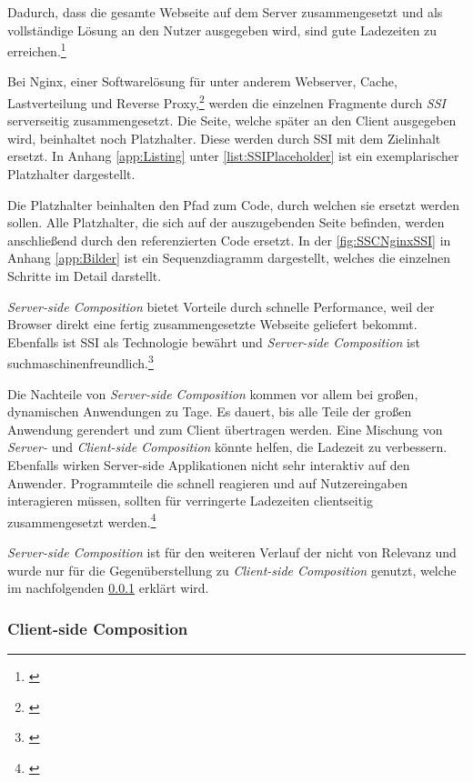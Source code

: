 Dadurch, dass die gesamte Webseite auf dem Server zusammengesetzt und als vollständige Lösung an den Nutzer ausgegeben wird, sind gute Ladezeiten zu erreichen.\footnote{\cite[vgl.][60]{Geers2020}}

Bei Nginx, einer Softwarelösung für unter anderem Webserver, Cache, Lastverteilung und Reverse Proxy,\footnote{\cite[vgl.][]{nginx2022}} werden die einzelnen Fragmente durch \textit{\gls{SSI}} serverseitig zusammengesetzt. Die Seite, welche später an den Client ausgegeben wird, beinhaltet noch Platzhalter. Diese werden durch \gls{SSI} mit dem Zielinhalt ersetzt. In Anhang \ref{app:Listing} unter \cref{list:SSIPlaceholder} ist ein exemplarischer Platzhalter dargestellt.

Die Platzhalter beinhalten den Pfad zum Code, durch welchen sie ersetzt werden sollen. Alle Platzhalter, die sich auf der auszugebenden Seite befinden, werden anschließend durch den referenzierten Code ersetzt. In der \cref{fig:SSCNginxSSI} in Anhang \ref{app:Bilder} ist ein Sequenzdiagramm dargestellt, welches die einzelnen Schritte im Detail darstellt.

\textit{Server-side Composition} bietet Vorteile durch schnelle Performance, weil der Browser direkt eine fertig zusammengesetzte Webseite geliefert bekommt. Ebenfalls ist \gls{SSI} als Technologie bewährt und \textit{Server-side Composition} ist suchmaschinenfreundlich.\footnote{\cite[vgl.][82\psq]{Geers2020}}

Die Nachteile von \textit{Server-side Composition} kommen vor allem bei großen, dynamischen Anwendungen zu Tage. Es dauert, bis alle Teile der großen Anwendung gerendert und zum Client übertragen werden. Eine Mischung von \textit{Server-} und \textit{Client-side Composition} könnte helfen, die Ladezeit zu verbessern. Ebenfalls wirken Server-side Applikationen nicht sehr interaktiv auf den Anwender. Programmteile die schnell reagieren und auf Nutzereingaben interagieren müssen, sollten für verringerte Ladezeiten clientseitig zusammengesetzt werden.\footnote{\cite[vgl.][83]{Geers2020}}

\textit{Server-side Composition} ist für den weiteren Verlauf der \dokumententyp{}
 nicht von Relevanz und wurde nur für die Gegenüberstellung zu \textit{Client-side Composition} genutzt, welche im nachfolgenden \cref{sec:ClientSideComposition} erklärt wird.

\subsubsection{Client-side Composition}\label{sec:ClientSideComposition}

